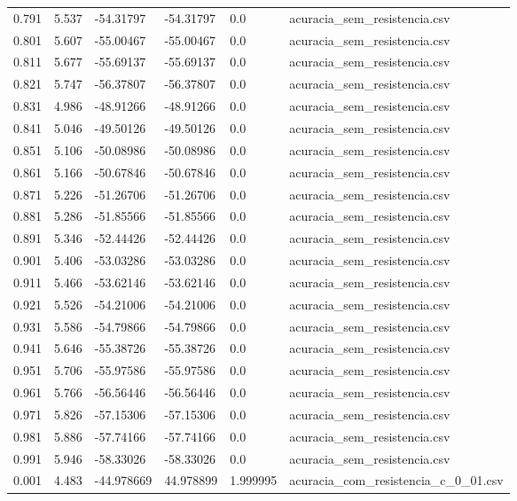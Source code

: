 \begin{table}
\begin{tabular}{llllll}
0.791 & 5.537 & -54.31797 & -54.31797 & 0.0 & acuracia\_sem\_resistencia.csv \\
0.801 & 5.607 & -55.00467 & -55.00467 & 0.0 & acuracia\_sem\_resistencia.csv \\
0.811 & 5.677 & -55.69137 & -55.69137 & 0.0 & acuracia\_sem\_resistencia.csv \\
0.821 & 5.747 & -56.37807 & -56.37807 & 0.0 & acuracia\_sem\_resistencia.csv \\
0.831 & 4.986 & -48.91266 & -48.91266 & 0.0 & acuracia\_sem\_resistencia.csv \\
0.841 & 5.046 & -49.50126 & -49.50126 & 0.0 & acuracia\_sem\_resistencia.csv \\
0.851 & 5.106 & -50.08986 & -50.08986 & 0.0 & acuracia\_sem\_resistencia.csv \\
0.861 & 5.166 & -50.67846 & -50.67846 & 0.0 & acuracia\_sem\_resistencia.csv \\
0.871 & 5.226 & -51.26706 & -51.26706 & 0.0 & acuracia\_sem\_resistencia.csv \\
0.881 & 5.286 & -51.85566 & -51.85566 & 0.0 & acuracia\_sem\_resistencia.csv \\
0.891 & 5.346 & -52.44426 & -52.44426 & 0.0 & acuracia\_sem\_resistencia.csv \\
0.901 & 5.406 & -53.03286 & -53.03286 & 0.0 & acuracia\_sem\_resistencia.csv \\
0.911 & 5.466 & -53.62146 & -53.62146 & 0.0 & acuracia\_sem\_resistencia.csv \\
0.921 & 5.526 & -54.21006 & -54.21006 & 0.0 & acuracia\_sem\_resistencia.csv \\
0.931 & 5.586 & -54.79866 & -54.79866 & 0.0 & acuracia\_sem\_resistencia.csv \\
0.941 & 5.646 & -55.38726 & -55.38726 & 0.0 & acuracia\_sem\_resistencia.csv \\
0.951 & 5.706 & -55.97586 & -55.97586 & 0.0 & acuracia\_sem\_resistencia.csv \\
0.961 & 5.766 & -56.56446 & -56.56446 & 0.0 & acuracia\_sem\_resistencia.csv \\
0.971 & 5.826 & -57.15306 & -57.15306 & 0.0 & acuracia\_sem\_resistencia.csv \\
0.981 & 5.886 & -57.74166 & -57.74166 & 0.0 & acuracia\_sem\_resistencia.csv \\
0.991 & 5.946 & -58.33026 & -58.33026 & 0.0 & acuracia\_sem\_resistencia.csv \\
0.001 & 4.483 & -44.978669 & 44.978899 & 1.999995 & acuracia\_com\_resistencia\_c\_0\_01.csv \\

\end{tabular}
\end{table}

